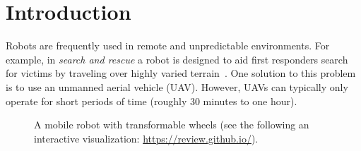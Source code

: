 \section{Introduction}

Robots are frequently used in remote and unpredictable environments.
%
%
For example, in \emph{search and rescue} a robot is designed to aid first responders search for victims by traveling over highly varied terrain~\citep{Graf.2017.2ISSCIS.RescuePathOptimization}.
%
One solution to this problem is to use an unmanned aerial vehicle (UAV). However, UAVs can typically only operate for short periods of time (roughly 30 minutes to one hour).

\begin{figure}[!ht]
    \centering

    \quad


    \caption{A mobile robot with transformable wheels (see the following an interactive visualization: \url{https://review.github.io/}).}
    \label{fig:robot}


\end{figure}

